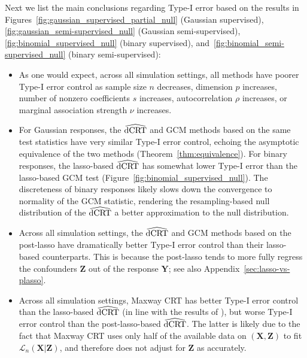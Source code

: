 \documentclass[aos]{imsart}
\theoremstyle{plain}
\theoremstyle{remark}
\newcommand{\prx}{\bm X}								%
\newcommand{\prz}{\bm Z}								%
\newcommand{\pry}{{\bm Y}}								%
\newcommand{\law}{\mathcal L}							%
\newcommand{\dCRThat}{\widehat{\textnormal{dCRT}}}		%
\begin{document}
Next we list the main conclusions regarding Type-I error based on the results in Figures~\ref{fig:gaussian_supervised_partial_null} (Gaussian supervised), \ref{fig:gaussian_semi-supervised_null} (Gaussian semi-supervised), \ref{fig:binomial_supervised_null} (binary supervised), and~\ref{fig:binomial_semi-supervised_null} (binary semi-supervised): 
\begin{itemize}
    \item As one would expect, across all simulation settings, all methods have poorer Type-I error control as sample size $n$ decreases, dimension $p$ increases, number of nonzero coefficients $s$ increases, autocorrelation $\rho$ increases, or marginal association strength $\nu$ increases.
    \item For Gaussian responses, the $\dCRThat$ and GCM methods based on the same test statistics have very similar Type-I error control, echoing the asymptotic equivalence of the two methods (Theorem~\ref{thm:equivalence}). For binary responses, the lasso-based $\dCRThat$ has somewhat lower Type-I error than the lasso-based GCM test (Figure~\ref{fig:binomial_supervised_null}). The discreteness of binary responses likely slows down the convergence to normality of the GCM statistic, rendering the resampling-based null distribution of the $\dCRThat$ a better approximation to the null distribution.
    \item Across all simulation settings, the $\dCRThat$ and GCM methods based on the post-lasso have dramatically better Type-I error control than their lasso-based counterparts. This is because the post-lasso tends to more fully regress the confounders $\prz$ out of the response $\pry$; see also Appendix~\ref{sec:lasso-vs-plasso}.
    \item Across all simulation settings, Maxway CRT has better Type-I error control than the lasso-based $\dCRThat$ (in line with the results of \cite{Li2022}), but worse Type-I error control than the post-lasso-based $\dCRThat$. The latter is likely due to the fact that Maxway CRT uses only half of the available data on $(\prx, \prz)$ to fit $\law_n(\prx|\prz)$, and therefore does not adjust for $\prz$ as accurately.
\end{itemize}
\end{document}

